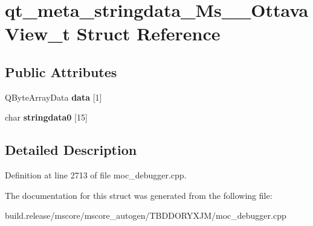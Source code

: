 \hypertarget{structqt__meta__stringdata___ms_____ottava_view__t}{}\section{qt\+\_\+meta\+\_\+stringdata\+\_\+\+Ms\+\_\+\+\_\+\+Ottava\+View\+\_\+t Struct Reference}
\label{structqt__meta__stringdata___ms_____ottava_view__t}
\subsection*{Public Attributes}
\begin{DoxyCompactItemize}
\item 
\mbox{\label{structqt__meta__stringdata___ms_____ottava_view__t_a75118ec39970207b1a6a1f60b3dacd1a}} 
Q\+Byte\+Array\+Data {\bfseries data} \mbox{[}1\mbox{]}
\item 
\mbox{\label{structqt__meta__stringdata___ms_____ottava_view__t_aaf30eefa0db7fcba040e0dab24b3010c}} 
char {\bfseries stringdata0} \mbox{[}15\mbox{]}
\end{DoxyCompactItemize}


\subsection{Detailed Description}


Definition at line 2713 of file moc\+\_\+debugger.\+cpp.



The documentation for this struct was generated from the following file\+:\begin{DoxyCompactItemize}
\item 
build.\+release/mscore/mscore\+\_\+autogen/\+T\+B\+D\+D\+O\+R\+Y\+X\+J\+M/moc\+\_\+debugger.\+cpp\end{DoxyCompactItemize}
